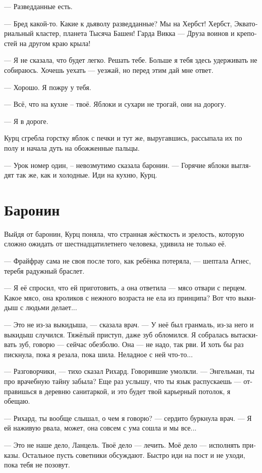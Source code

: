 \documentclass[a4paper,12pt,fleqn]{book}\usepackage{cooltooltips}\usepackage{polyglossia}\setdefaultlanguage[babelshorthands=true]{russian}\setotherlanguage{english}\defaultfontfeatures{Ligatures=TeX,Mapping=tex-text} \usepackage{xcolor}\definecolor{lightgray}{HTML}{bbbbbb}\color{lightgray}\newcommand{\ml}[3]{\textenglish{\textcolor{black}{#3}}}
\begin{document}
--- Разведданные есть.

--- Бред какой-то.
Какие к дьяволу разведданные?
Мы на Хербст!
Хербст, Экваториальный кластер, планета Тысяча Башен!
Гарда Викка --- Друза воинов и крепостей на другом краю крыла!

--- Я не сказала, что будет легко.
Решать тебе.
Больше я тебя здесь удерживать не собираюсь.
Хочешь уехать --- уезжай, но перед этим дай мне ответ.

--- Хорошо.
Я пожру у тебя.

--- Всё, что на кухне -- твоё.
Яблоки и сухари не трогай, они на дорогу.

--- Я в дороге.

Курц сгребла горстку яблок с печки и тут же, выругавшись, рассыпала их по полу и начала дуть на обожженные пальцы.

--- Урок номер один, -- невозмутимо сказала баронин.
--- Горячие яблоки выглядят так же, как и холодные.
Иди на кухню, Курц.

\section{Баронин}

Выйдя от баронин, Курц поняла, что странная жёсткость и зрелость, которую сложно ожидать от шестнадцатилетнего человека, удивила не только её.

--- Фрайфрау сама не своя после того, как ребёнка потеряла, --- шептала Агнес, теребя радужный браслет.

--- Я её спросил, что ей приготовить, а она ответила --- мясо отвари с перцем.
Какое мясо, она кроликов с нежного возраста не ела из принципа?
Вот что выкидыш с людьми делает...

--- Это не из-за выкидыша, --- сказала врач.
--- У неё был гранмаль, из-за него и выкидыш случился.
Тяжёлый приступ, даже зуб обломился.
Я собралась вытаскивать зуб, говорю --- сейчас обезболю.
Она --- не надо, так рви.
И хоть бы раз пискнула, пока я резала, пока шила.
Неладное с ней что-то...

--- Разговорчики, --- тихо сказал Рихард.
Говорившие умолкли.
--- Энгельман, ты про врачебную тайну забыла?
Еще раз услышу, что ты язык распускаешь --- отправишься в деревню санитаркой, и это будет твой карьерный потолок, я обещаю.

--- Рихард, ты вообще слышал, о чем я говорю? --- сердито буркнула врач.
--- Я ей наживую рвала, может, она совсем с ума сошла и мы все...

--- Это не наше дело, Ланцель.
Твоё дело --- лечить.
Моё дело --- исполнять приказы.
Остальное пусть советники обсуждают.
Быстро иди на пост и не уходи, пока тебя не позовут.
\end{document}
